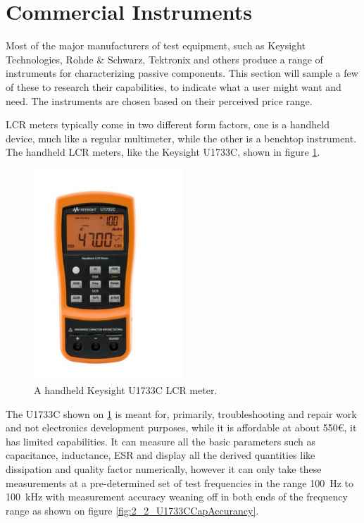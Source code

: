 \section{Commercial Instruments} \label{sec:CommercialImpedanceMeasurement}
Most of the major manufacturers of test equipment, such as Keysight Technologies, Rohde \& Schwarz, Tektronix and others produce a range of instruments for characterizing passive components. This section will sample a few of these to research their capabilities, to indicate what a user might want and need. The instruments are chosen based on their perceived price range. 

LCR meters typically come in two different form factors, one is a handheld device, much like a regular multimeter, while the other is a benchtop instrument. The handheld LCR meters, like the Keysight U1733C\cite{KeysightU1733C}, shown in figure \ref{fig:2_2_U1733C}.
\begin{figure}[H]
    \centering
    \includegraphics[clip, trim=0 50 0 50, width=0.5\textwidth]{Sections/2_ProblemAnalysis/FIgures/KeysightU1733C.pdf}
    \caption{A handheld Keysight U1733C LCR meter.\cite{KeysightU1733C}}
    \label{fig:2_2_U1733C}
\end{figure}
The U1733C shown on \ref{fig:2_2_U1733C} is meant for, primarily, troubleshooting and repair work and not electronics development purposes, while it is affordable at about 550€, it has limited capabilities. It can measure all the basic parameters such as capacitance, inductance, ESR and display all the derived quantities like dissipation and quality factor numerically, however it can only take these measurements at a pre-determined set of test frequencies in the range \SI[]{100}{\hertz} to \SI[]{100}{\kilo\hertz} with measurement accuracy weaning off in both ends of the frequency range as shown on figure \ref{fig:2_2_U1733CCapAccurancy}.

